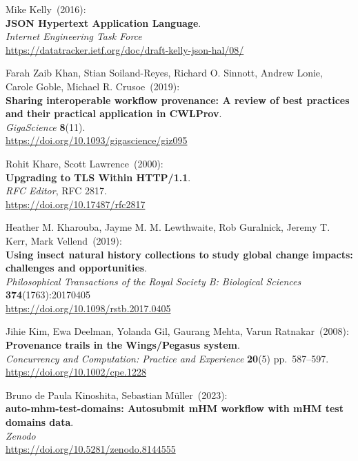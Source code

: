 \begin{thebibliography}{9}
Mike Kelly~(2016): \\
\textbf{JSON Hypertext Application Language}.\\
\emph{Internet Engineering Task Force}\\
\url{https://datatracker.ietf.org/doc/draft-kelly-json-hal/08/}

Farah Zaib Khan, Stian Soiland-Reyes, Richard O. Sinnott,
Andrew Lonie, Carole Goble, Michael R. Crusoe~(2019): \\
\textbf{Sharing interoperable workflow provenance: A review of best
practices and their practical application in CWLProv}.\\
\emph{GigaScience} \textbf{8}(11).\\
\url{https://doi.org/10.1093/gigascience/giz095}

Rohit Khare, Scott Lawrence~(2000): \\
\textbf{Upgrading to {TLS Within HTTP}/1.1}.\\
\emph{RFC Editor}, RFC 2817. \\
\url{https://doi.org/10.17487/rfc2817}

Heather M. Kharouba, Jayme M. M. Lewthwaite, Rob Guralnick, Jeremy T. Kerr, Mark Vellend~(2019): \\
\textbf{Using insect natural history collections to study global change impacts: challenges and opportunities}.\\
\emph{Philosophical Transactions of the Royal Society B: Biological Sciences}
\textbf{374}(1763):20170405\\
\url{https://doi.org/10.1098/rstb.2017.0405}

Jihie Kim, Ewa Deelman, Yolanda Gil, Gaurang Mehta, Varun
Ratnakar~(2008): \\
\textbf{Provenance trails in the Wings/Pegasus system}.\\
\emph{Concurrency and Computation: Practice and Experience}
\textbf{20}(5) pp.~587--597.\\
\url{https://doi.org/10.1002/cpe.1228}

Bruno de Paula Kinoshita, Sebastian Müller~(2023): \\
\textbf{auto-mhm-test-domains: Autosubmit mHM workflow with mHM test domains data}.\\
\emph{Zenodo}\\
\url{https://doi.org/10.5281/zenodo.8144555}


\end{thebibliography}
